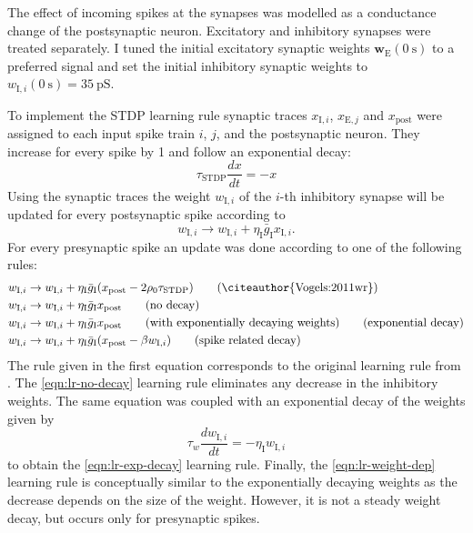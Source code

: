 \documentclass[11pt,a4paper]{scrartcl}
\newcommand{\I}[1]{_{\text{I}#1}}
\newcommand{\E}[1]{_{\text{E}#1}}
\newcommand{\post}{_{\text{post}}}
\begin{document}
The effect of incoming spikes at the synapses was modelled as a conductance 
change of the postsynaptic neuron. Excitatory and inhibitory synapses were 
treated separately. I tuned the initial excitatory synaptic weights 
$\mathbf{w}\E{}(\SI{0}{\second})$ to a preferred signal and set the initial 
inhibitory synaptic weights to $w\I{,i}(\SI{0}{\second}) 
= \SI{35}{\pico\siemens}$.

To implement the STDP learning rule synaptic traces $x\I{,i}$, $x\E{,j}$ and 
$x\post$ were assigned to each input spike train $i$, $j$, and the postsynaptic 
neuron.  They increase for every spike by \num{1} and follow an exponential 
decay:
\begin{equation}
    \tau_{\text{STDP}} \frac{dx}{dt} = -x \label{eqn:syntrace}
\end{equation}
Using the synaptic traces the weight $w\I{,i}$ of the $i$-th inhibitory synapse 
will be updated for every postsynaptic spike according to
\begin{equation}
    w\I{,i} \rightarrow w\I{,i} + \eta\I{} \bar g\I{} x\I{,i} \text{.}
\end{equation}
For every presynaptic spike an update was done according to one of the following 
rules:
\begin{align}
    w\I{,i} &\rightarrow w\I{,i} + \eta\I{} \bar g\I{} (x\post - 2 \rho_0 
\tau_{\text{STDP}}) \label{eqn:lr-orig} \tag{\citeauthor{Vogels:2011wr}} \\
    w\I{,i} &\rightarrow w\I{,i} + \eta\I{} \bar g\I{} x\post \label{eqn:lr-no-decay} 
\tag{no decay} \\
    w\I{,i} &\rightarrow w\I{,i} + \eta\I{} \bar g\I{} x\post \qquad\text{(with 
    exponentially decaying weights)} \label{eqn:lr-exp-decay} \tag{exponential 
    decay} \\
    w\I{,i} &\rightarrow w\I{,i} + \eta\I{} \bar g\I{} (x\post - \beta w\I{,i}) 
\label{eqn:lr-weight-dep} \tag{spike related decay}
\end{align}
The rule given in the first equation corresponds to the original learning rule 
from \textcite{Vogels:2011wr}. The \ref{eqn:lr-no-decay} learning rule 
eliminates any decrease in the inhibitory weights. The same equation was coupled 
with an exponential decay of the weights given by
\begin{equation}
    \tau_w \frac{dw\I{,i}}{dt} = -\eta\I{} w\I{,i}
\end{equation}
to obtain the \ref{eqn:lr-exp-decay} learning rule.
Finally, the \ref{eqn:lr-weight-dep} learning rule is conceptually similar to 
the exponentially decaying weights as the decrease depends on the size of the 
weight. However, it is not a steady weight decay, but occurs only for 
presynaptic spikes.
\end{document}
